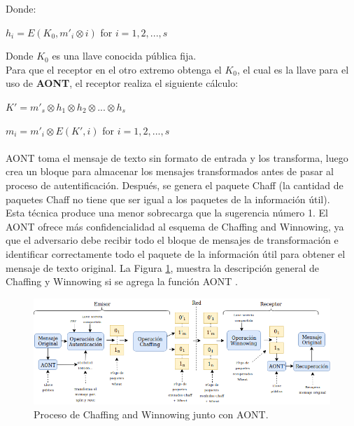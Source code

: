 \documentclass[12pt, a4paper, titlepage]{report}
\begin{document}
        Donde:
        \begin{center}
            $h_i=E(K_0,m'_i \otimes i)$ for $i=1,2,...,s$
        \end{center}
        
        Donde $K_0$ es una llave conocida pública fija.\\
        Para que el receptor en el otro extremo obtenga el $K_0$, el cual es la llave para el uso de \textbf{AONT}, el receptor realiza el siguiente cálculo:
        
        \begin{center}
            $K'=m'_s \otimes h_1 \otimes h_2 \otimes ... \otimes h_s$
        \end{center}
        \begin{center}
            $m_i=m'_i \otimes E(K',i)$ for $i=1,2,...,s$
        \end{center}
        
        \paragraph{}
        AONT toma el mensaje de texto sin formato de entrada y los transforma, luego crea un bloque para almacenar los mensajes transformados antes de pasar al proceso de autentificación. Después, se genera el paquete Chaff (la cantidad de paquetes Chaff no tiene que ser igual a los paquetes de la informaci\'on \'util).\\
        Esta técnica produce una menor sobrecarga que la sugerencia número 1. El AONT ofrece más confidencialidad al esquema de Chaffing and Winnowing, ya que el adversario debe recibir todo el bloque de mensajes de transformación e identificar correctamente todo el paquete de la informaci\'on \'util para obtener el mensaje de texto original. La Figura \ref{fig:C&W_AONT}, muestra la descripción general de Chaffing y Winnowing si se agrega la función AONT \cite{refAONT}.
        
        \begin{figure}[H]
			\begin{center}	          \includegraphics[width=14cm]{./imagenes/MarcoTeorico/chaffVsCrypto.png}
				\caption{Proceso de Chaffing and Winnowing junto con AONT.}
				\label{fig:C&W_AONT}
			\end{center}
		\end{figure}
		
\end{document}
